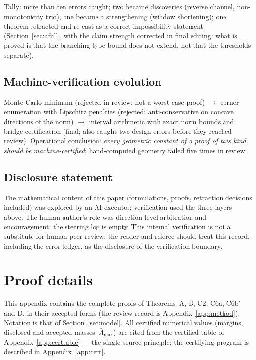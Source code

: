 \documentclass[11pt]{article}
\newcommand{\relL}{\bar\Lambda}
\begin{document}
Tally: more than ten errors caught; two became discoveries (reverse channel,
non-monotonicity trio), one became a strengthening (window shortening); one
theorem retracted and re-cast as a correct impossibility statement
(Section~\ref{sec:afull}, with the claim strength corrected in final
editing: what is proved is that the branching-type bound does not extend,
not that the thresholds separate).

\subsection{Machine-verification evolution}
Monte-Carlo minimum (rejected in review: not a worst-case proof) $\to$
corner enumeration with Lipschitz penalties (rejected: anti-conservative on
concave directions of the norm) $\to$ interval arithmetic with exact norm
bounds and bridge certification (final; also caught two design errors before
they reached review). Operational conclusion: \emph{every geometric constant
of a proof of this kind should be machine-certified}; hand-computed geometry
failed five times in review.

\subsection{Disclosure statement}
The mathematical content of this paper (formulations, proofs, retraction
decisions included) was explored by an AI executor; verification used the
three layers above. The human author's role was direction-level arbitration
and encouragement; the steering log is empty. This internal verification is
not a substitute for human peer review; the reader and referee should treat
this record, including the error ledger, as the disclosure of the
verification boundary.

\section{Proof details}\label{app:proofs}

This appendix contains the complete proofs of Theorems~A, B, C2, C6a,
C6b$'$ and D, in their accepted forms (the review record is
Appendix~\ref{app:method}). Notation is that of
Section~\ref{sec:model}. All certified numerical values (margins,
disclosed and accepted masses, $\relL_{\max}$) are cited from the
certified table of Appendix~\ref{app:certtable} --- the single-source
principle; the certifying program is described in Appendix~\ref{app:cert}.
\end{document}
